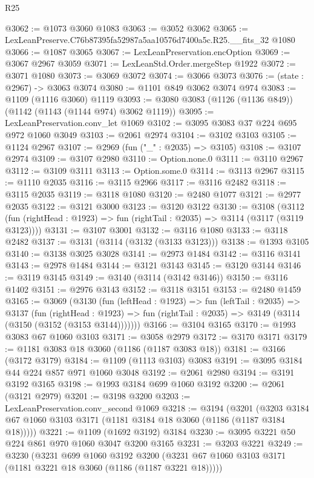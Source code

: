\begin{lexlean}{R25}
\begin{coremodule}
@3062 := @1073 @3060 @1083
@3063 := @3052 @3062
@3065 := LexLeanPreserve.C76b87395fa52987a5aa10576d7400a5c.R25.__fits_32 @1080
@3066 := @1087 @3065
@3067 := LexLeanPreservation.encOption
@3069 := @3067 @2967 @3059
@3071 := LexLeanStd.Order.mergeStep @1922
@3072 := @3071 @1080
@3073 := @3069 @3072
@3074 := @3066 @3073
@3076 := (state : @2967) -> @3063 @3074
@3080 := @1101 @849 @3062 @3074 @974
@3083 := @1109 (@1116 @3060) @1119
@3093 := @3080 @3083 (@1126 (@1136 @849)) (@1142 (@1143 (@1144 @974) @3062 @1119))
@3095 := LexLeanPreservation.conv_let @1069
@3102 := @3095 @3083 @37 @224 @695 @972 @1060 @3049
@3103 := @2061 @2974
@3104 := @3102 @3103
@3105 := @1124 @2967
@3107 := @2969 (fun ("_" : @2035) => @3105)
@3108 := @3107 @2974
@3109 := @3107 @2980
@3110 := Option.none.{0}
@3111 := @3110 @2967
@3112 := @3109 @3111
@3113 := Option.some.{0}
@3114 := @3113 @2967
@3115 := @1110 @2035
@3116 := @3115 @2966
@3117 := @3116 @2482
@3118 := @3115 @2035
@3119 := @3118 @1080
@3120 := @2480 @1077
@3121 := @2977 @2035
@3122 := @3121 @3000
@3123 := @3120 @3122
@3130 := @3108
    (@3112 (fun (rightHead : @1923) => fun (rightTail : @2035) => @3114 (@3117 (@3119 @3123))))
@3131 := @3107 @3001
@3132 := @3116 @1080
@3133 := @3118 @2482
@3137 := @3131 (@3114 (@3132 (@3133 @3123)))
@3138 := @1393 @3105
@3140 := @3138 @3025 @3028
@3141 := @2973 @1484
@3142 := @3116 @3141
@3143 := @2978 @1484
@3144 := @3121 @3143
@3145 := @3120 @3144
@3146 := @3119 @3145
@3149 := @3140 (@3114 (@3142 @3146))
@3150 := @3116 @1402
@3151 := @2976 @3143
@3152 := @3118 @3151
@3153 := @2480 @1459
@3165 := @3069
    (@3130
      (fun (leftHead : @1923) =>
      fun (leftTail : @2035) =>
      @3137
        (fun (rightHead : @1923) =>
        fun (rightTail : @2035) => @3149 (@3114 (@3150 (@3152 (@3153 @3144)))))))
@3166 := @3104 @3165
@3170 := @1993 @3083 @67 @1060 @3103
@3171 := @3058 @2979
@3172 := @3170 @3171
@3179 := @1181 @3083 @18 @3060 (@1186 (@1187 @3083 @18))
@3181 := @3166 (@3172 @3179)
@3184 := @1109 (@1113 @3103) @3083
@3191 := @3095 @3184 @44 @224 @857 @971 @1060 @3048
@3192 := @2061 @2980
@3194 := @3191 @3192 @3165
@3198 := @1993 @3184 @699 @1060 @3192
@3200 := @2061 (@3121 @2979)
@3201 := @3198 @3200
@3203 := LexLeanPreservation.conv_second @1069
@3218 := @3194
    (@3201 (@3203 @3184 @67 @1060 @3103 @3171 (@1181 @3184 @18 @3060 (@1186 (@1187 @3184 @18)))))
@3221 := @1109 (@1692 @3192) @3184
@3230 := @3095 @3221 @50 @224 @861 @970 @1060 @3047 @3200 @3165
@3231 := @3203 @3221
@3249 := @3230
    (@3231
      @699
      @1060
      @3192
      @3200
      (@3231 @67 @1060 @3103 @3171 (@1181 @3221 @18 @3060 (@1186 (@1187 @3221 @18)))))

\end{coremodule}
\end{lexlean}
